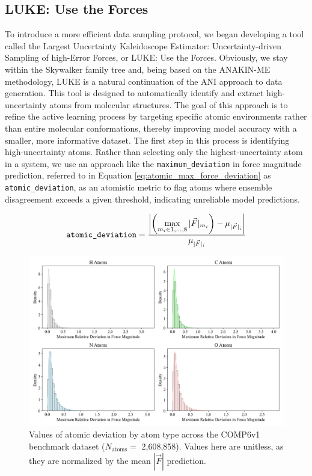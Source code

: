 \subsection{LUKE: Use the Forces}
\label{subsec:luke}

To introduce a more efficient data sampling protocol, we began developing a tool called the Largest Uncertainty Kaleidoscope Estimator: Uncertainty-driven Sampling of high-Error Forces, or LUKE: Use the Forces.
Obviously, we stay within the Skywalker family tree and, being based on the ANAKIN-ME methodology, LUKE is a natural continuation of the ANI approach to data generation.
This tool is designed to automatically identify and extract high-uncertainty atoms from molecular structures. 
The goal of this approach is to refine the active learning process by targeting specific atomic environments rather than entire molecular conformations, thereby improving model accuracy with a smaller, more informative dataset. 
The first step in this process is identifying high-uncertainty atoms. 
Rather than selecting only the highest-uncertainty atom in a system, we use an approach like the \verb|maximum_deviation| in force magnitude prediction, referred to in Equation \ref{eq:atomic_max_force_deviation} as \verb|atomic_deviation|, as an atomistic metric to flag atoms where ensemble disagreement exceeds a given threshold, indicating unreliable model predictions.

\begin{equation} 
\verb|atomic_deviation| = 
\frac{\left| \left(\max\limits_{m_i \in {1, \dots, 8}} |\vec{F}|_{m_i} \right)- {\mu_{|\vec{F}|_i}} \right|}{\mu_{|\vec{F}|_i}} 
\label{eq:atomic_max_force_deviation}
\end{equation}

\begin{figure}[!hb]
    \centering
    \includegraphics[width=0.9\linewidth]{Images/2xr_forces/max_force_deviation_by_species_subplots.png}
    \caption[Values of atomic deviation by atom type (COMP6v1)]{Values of atomic deviation by atom type across the COMP6v1 benchmark dataset ($N_\text{atoms}=$ 2,608,858). Values here are unitless, as they are normalized by the mean $|\vec{F}|$ prediction.}
    \label{fig:atomic_deviations}
\end{figure}

